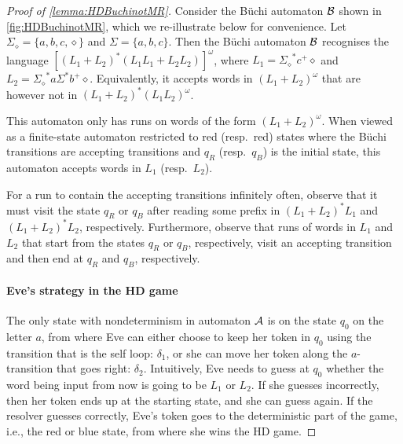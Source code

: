 \HDBuchinotMR*
\begin{proof}[Proof of \cref{lemma:HDBuchinotMR}]
    Consider the B\"uchi automaton $\mathcal{B}$ shown in \cref{fig:HDBuchinotMR}, which we re-illustrate  below for convenience.
    Let $\Sigma_{\diamond}=\{a,b,c,\diamond\}$ and $\Sigma=\{a,b,c\}$. Then the B\"uchi automaton $\mathcal{B}$ recognises the language  $\left[(L_1+L_2)^*(L_1L_1+L_2L_2)\right]^\omega$, where $L_1 = {\Sigma_\diamond}^*  c^+\diamond $ and $L_2 =  
    {\Sigma_\diamond}^* a \Sigma^* b^+\diamond
    $.  Equivalently, it accepts words in $(L_1+L_2)^\omega$ that are however not in $(L_1+L_2)^*(L_1L_2)^\omega$.  
    
    This automaton only has runs on words of the form $(L_1+L_2)^\omega$. When viewed as a finite-state automaton restricted to red (resp.\ red) states where the B\"uchi transitions are accepting transitions and $q_R$ (resp.\ $q_B$) is the initial state, this automaton accepts words in $L_1$ (resp.\ $L_2$). 
    
    For a run to contain the accepting transitions infinitely often, observe that it must visit the state $q_R$ or $q_B$ after reading some prefix in $(L_1+L_2)^*L_1$ and $(L_1+L_2)^*L_2$, respectively. Furthermore, observe that runs of words in $L_1$ and $L_2$ that start from the states $q_R$ or $q_B$, respectively, visit an accepting transition and then end at $q_R$ and $q_B$, respectively. %

\paragraph*{Eve's strategy in the HD game}
The only state with nondeterminism in automaton $\mathcal{A}$ is on the state $q_0$ on the letter $a$, from where  Eve can either choose to keep her token in $q_0$ using the transition that is the self loop: $\delta_1$, or she can move her token along the $a$-transition that goes right: $\delta_2$.  
Intuitively, Eve needs to guess at $q_0$ whether the word being input from now is going to be $L_1$ or $L_2$. If she guesses incorrectly, then her token ends up at the starting state, and she can guess again. If the resolver guesses correctly, Eve's token goes to the deterministic part of the game, i.e., the red or blue state, from where she wins the HD game. 


\end{proof}
